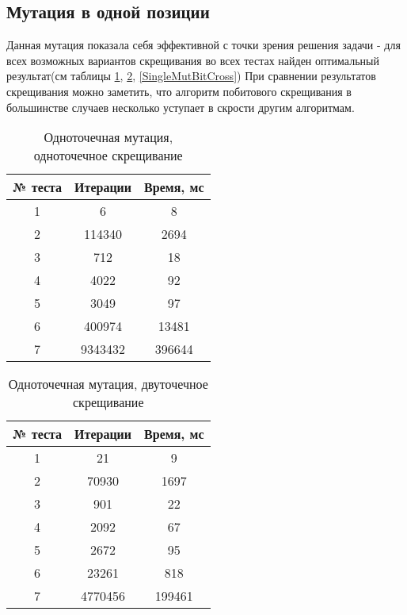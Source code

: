 \subsection{Мутация в одной позиции}
Данная мутация показала себя эффективной с точки зрения решения задачи - для всех возможных вариантов скрещивания во всех тестах найден оптимальный результат(см таблицы \ref{SingleMutSingleCross}, \ref{SingleMutDoubleCross}, \ref{SingleMutBitCross})
При сравнении результатов скрещивания можно заметить, что алгоритм побитового скрещивания в большинстве случаев несколько уступает в скрости другим алгоритмам.
\begin{table}[ht]
\centering
\caption{Одноточечная мутация, одноточечное скрещивание}
\label{SingleMutSingleCross}
\begin{tabular}{|c|c|c|}
\hline
№ теста             & Итерации            & Время, мс            \\ \hline
1                   & 6                   & 8                    \\ \hline
2                   & 114340              & 2694                 \\ \hline
3                   & 712                 & 18                   \\ \hline
4                   & 4022                & 92                   \\ \hline
5                   & 3049                & 97                   \\ \hline
6                   & 400974              & 13481                \\ \hline
7                   & 9343432             & 396644               \\ \hline
\end{tabular}
\end{table}

\begin{table}[ht]
\centering
\caption{Одноточечная мутация, двуточечное скрещивание}
\label{SingleMutDoubleCross}
\begin{tabular}{|c|c|c|}
\hline
№ теста & Итерации & Время, мс \\ \hline
1       & 21       & 9         \\ \hline
2       & 70930    & 1697      \\ \hline
3       & 901      & 22        \\ \hline
4       & 2092     & 67        \\ \hline
5       & 2672     & 95        \\ \hline
6       & 23261    & 818       \\ \hline
7       & 4770456  & 199461    \\ \hline
\end{tabular}
\end{table}

